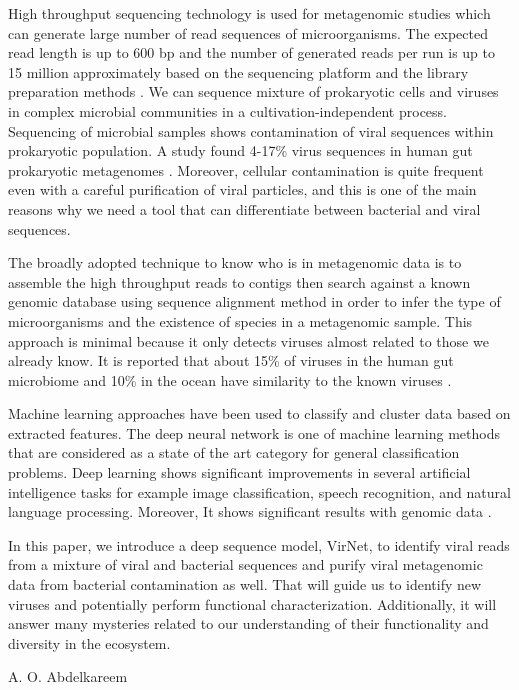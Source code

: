 \documentclass[10pt,journal,compsoc]{IEEEtran}
\begin{document}
High throughput sequencing technology is used for metagenomic studies which can generate large number of read  sequences of microorganisms. The expected read length is up to 600 bp and the number of generated reads per run is up to 15 million approximately based on the sequencing platform and the library preparation methods \cite{allali2017comparison}. We can sequence mixture of prokaryotic cells and viruses in complex microbial communities in a cultivation-independent process. Sequencing of microbial samples shows contamination of viral sequences within prokaryotic population. A study found 4-17\% virus sequences in human gut prokaryotic metagenomes \cite{minot2011human}. Moreover, cellular contamination is quite frequent even with a careful purification of viral particles, and this is one of the main reasons why we need a tool that can differentiate between bacterial and viral sequences.

The broadly adopted technique to know who is in metagenomic data is to assemble the high throughput reads to contigs then search against a known genomic database using sequence alignment method in order to infer the type of microorganisms and the existence of species in a metagenomic sample. This approach is minimal because it only detects viruses almost related to those we already know. It is reported that about 15\% of viruses in the human gut microbiome and 10\% in the ocean have similarity to the known viruses \cite{ren2017virfinder}. 

Machine learning approaches have been used to classify and cluster data based on extracted features. The deep neural network is one of machine learning methods that are considered as a state of the art category for general classification problems. Deep learning shows significant improvements in several artificial intelligence tasks for example image classification, speech recognition, and natural language processing. Moreover, It shows significant results with genomic data \cite{angermueller2016deep}. %

In this paper, we introduce a deep sequence model, VirNet, to identify viral reads from a mixture of viral and bacterial sequences and purify viral metagenomic data from bacterial contamination as well. That will guide us to identify new viruses and potentially perform functional characterization. Additionally, it will answer many mysteries related to our understanding of their functionality and diversity in the ecosystem.


\hfill A. O. Abdelkareem
\end{document}
